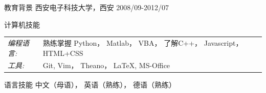 \documentclass{resume} %
\begin{document}
\begin{CJK*}{UTF8}{gbsn}
\begin{rSection}{教育背景}
西安电子科技大学，西安 \hfill  2008/09-2012/07\\



\end{rSection}

\begin{rSection}{计算机技能}
\begin{tabular}{l l}
{\sl 编程语言:} &熟练掌握 Python， Matlab， VBA， 了解C++， Javascript， HTML+CSS\\
{\sl 工具:} &Git, Vim， Theano， \LaTeX{}, MS-Office
\end{tabular}

\end{rSection}

\begin{rSection}{语言技能}
中文（母语）， 英语（熟练）， 德语（熟练）
\end{rSection}




% 
% 


\end{CJK*}
\end{document}
